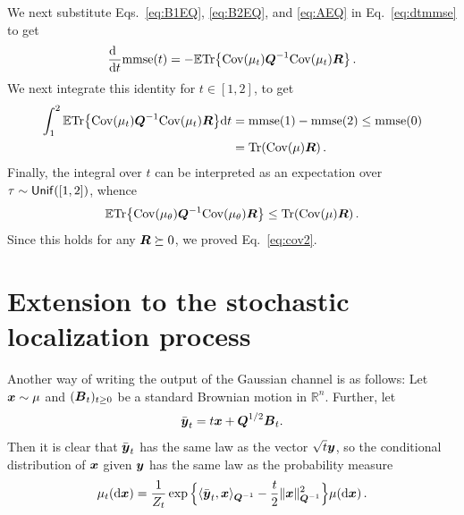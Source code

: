 \documentclass[11pt]{article}
\numberwithin{equation}{section}
\theoremstyle{myremark}
\theoremstyle{myremark}
\theoremstyle{myexample}
\newcommand{\R}{\mathbb{R}}
\newcommand{\1}{\mathbf{1}}
\begin{document}
  We next substitute Eqs.~\eqref{eq:B1EQ}, \eqref{eq:B2EQ}, and \eqref{eq:AEQ}
 in Eq.~\eqref{eq:dtmmse} to get
  \begin{align}
  \dert\mmse(t) = -\E\Tr\big\{\cov(\mus)\bQ^{-1}\cov(\mus)\bR\big\} \, .
  \end{align}
  We next integrate this identity for $t\in[1,2]$, to get
  \begin{align*}
  \int_1^2{\mathbb E}{\rm Tr}\big\{{\rm Cov}(\mu_{t}){\boldsymbol{Q}}^{-1}{\rm Cov}(\mu_{t}){\boldsymbol R}\big\} {\rm d} t &=
  {\rm mmse}(1)-{\rm mmse}(2)\le {\rm mmse}(0)\\
  & =  {\rm Tr}( {\rm Cov}(\mu){\boldsymbol R})\,.
  \end{align*}
  Finally, the integral over $t$ can be interpreted as an expectation over 
  $\tau\sim{\sf Unif}([1,2])$, whence
  \begin{align*}
\E\Tr\big\{\cov(\mu_{\theta})\bQ^{-1}\cov(\mu_{\theta})\bR\big\} \le
\Tr( \cov(\mu)\bR)\, .
%
\end{align*}
%
Since this holds for any ${\boldsymbol R}\succeq 0$, we proved Eq.~\eqref{eq:cov2}. 



\section{Extension to the stochastic localization process}
\label{sec:Equivalence}

Another way of writing the output of the Gaussian channel is as follows: Let ${\boldsymbol{x}} \sim \mu$ and $(\boldsymbol{B}_t)_{t \ge 0}$ be a standard Brownian motion in $\R^n$. Further, let 
\begin{equation}
\bar{{\boldsymbol{y}}}_t = t {\boldsymbol{x}} + {\boldsymbol{Q}}^{1/2} \boldsymbol{B}_t.
\end{equation}
Then it is clear that $\bar{{\boldsymbol{y}}}_t$ has the same law as the vector $\sqrt{t}{\boldsymbol{y}}$, so the conditional distribution of ${\boldsymbol{x}}$ given ${\boldsymbol{y}}$ has the same law as the probability measure 
\begin{equation}\label{eq:mut}
\mu_t({\rm d} {\boldsymbol{x}}) = \frac{1}{Z_t} 
\exp\Big\{\langle \bar{{\boldsymbol{y}}}_t ,  {\boldsymbol{x}}\rangle_{{\boldsymbol{Q}}^{-1}} - \frac{t}{2} \|{\boldsymbol{x}}\|_{{\boldsymbol{Q}}^{-1}}^2\Big\}  \mu({\rm d} {\boldsymbol{x}}) \, .
\end{equation}
\end{document}
